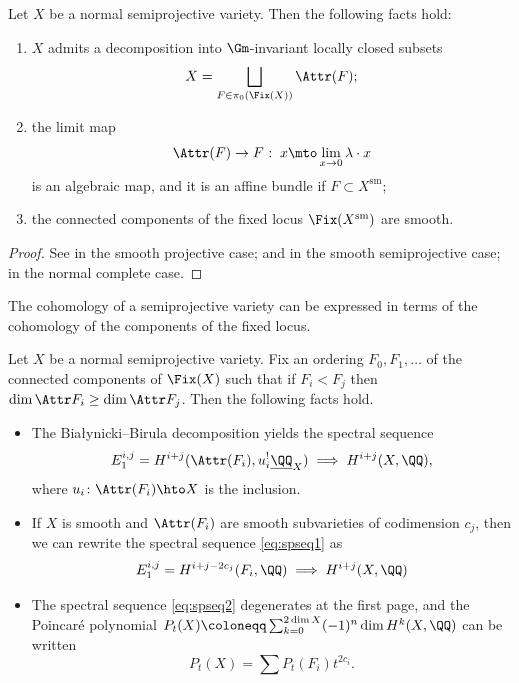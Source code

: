 \begin{thm}\label{BBdecomposition}
Let $X$ be a normal semiprojective variety. Then the following facts hold:
\begin{enumerate}
\item $X$ admits a decomposition into $\Gm$\nobreakdash-invariant locally closed subsets
\[
X = \bigsqcup_{F \in \pi_0(\Fix(X))} \Attr(F);
\]
\item \label{limitmap} the limit map
\[
\Attr(F) \to F \:\colon\: x \mto \lim_{x \to 0}\lambda \cdot x
\]
is an algebraic map, and it is an affine bundle if $F \subset X^{\mathrm{sm}}$;
\item the connected components of the fixed locus $\Fix(X^{\mathrm{sm}})$ are smooth.
\end{enumerate}
\end{thm}
\begin{proof}
See \cite[Th.\,4.3]{BB73} in the smooth projective case; \cite[\S 1.2]{HauselVillegas15} and \cite[Lem.\,3.2.4]{MaulikOkunkov19} in the smooth semiprojective case; \cite[Cor.\,4]{Weber17} in the normal complete case.
\end{proof}

The cohomology of a semiprojective variety can be expressed in terms of the cohomology of the components of the fixed locus.
\begin{thm}\label{local-to-globalspseq}
Let $X$ be a normal semiprojective variety. Fix an ordering $F_0, F_1, \ldots$ of the connected components of $\Fix(X)$ such that if $F_i < F_j$ then $\dim \Attr F_i \geq \dim \Attr F_j$. Then the following facts hold.
\begin{itemize}
\item The Białynicki--Birula decomposition yields the spectral sequence
\begin{equation}\label{eq:spseq1}
E^{i,j}_1= H^{i+j}(\Attr(F_i), u^{!}_i \underline{\QQ}_X) \implies H^{i+j}(X, \QQ),
\end{equation}
where $u_i \colon \Attr(F_i) \hto X$ is the inclusion.
\item If $X$ is smooth and $\Attr(F_i)$ are smooth subvarieties of codimension $c_j$, then we can rewrite the spectral sequence \eqref{eq:spseq1} as\vspace*{-3pt}
\begin{equation}\label{eq:spseq2}
E^{i,j}_1= H^{i+j-2c_j}(F_i, \QQ) \implies H^{i+j}(X, \QQ)
\end{equation}
\item The spectral sequence \eqref{eq:spseq2} degenerates at the first page, and the Poincaré polynomial $P_t(X)\coloneqq \sum^{2\dim X}_{k=0} (-1)^n \dim H^k(X, \QQ)$ can be written\vspace*{-3pt}
\[
P_t(X) = \sum P_t(F_i)t^{2c_i}.
\]
\end{itemize}
\end{thm}
